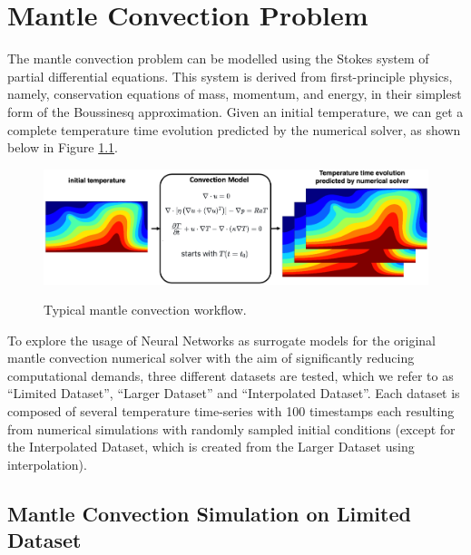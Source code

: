 \chapter{Mantle Convection Problem}\label{chap:evaluation}

The mantle convection problem can be modelled using the Stokes system of partial differential equations.
This system is  derived from first-principle physics, namely, conservation equations of mass, momentum, and energy, in their simplest form of the Boussinesq approximation. Given an initial temperature, we can get a complete temperature time evolution predicted by the numerical solver, as shown below in Figure \ref{figure:MC_workflow}.

\begin{figure}[H]
    \caption{Typical mantle convection workflow.}
    \includegraphics[scale=0.15]{figures/mantle_convection_images/Mantle_Convection_workflow.png}
    \label{figure:MC_workflow}
\end{figure}

To explore the usage of Neural Networks as surrogate models for the original mantle convection numerical solver with the aim of significantly reducing computational demands, three different datasets are tested, which we refer to as  ``Limited Dataset'', ``Larger Dataset'' and ``Interpolated Dataset''. Each dataset is composed of several temperature time-series with 100 timestamps each resulting from numerical simulations with randomly sampled initial conditions (except for the Interpolated Dataset, which is created from the Larger Dataset using interpolation).

\section{Mantle Convection Simulation on Limited Dataset}

